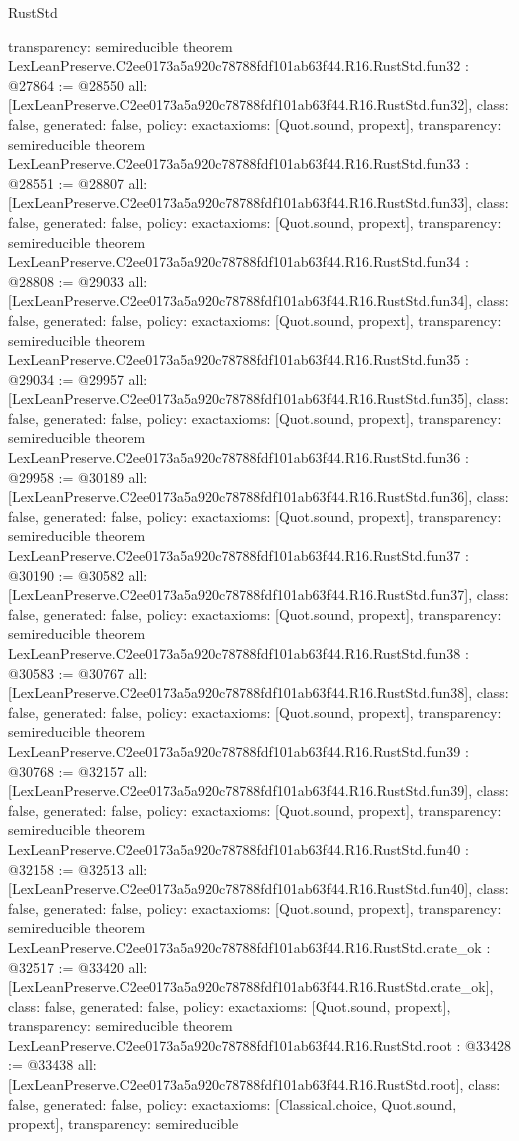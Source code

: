 \begin{lexlean}{RustStd}
\begin{coremodule}
{  transparency: semireducible
}
theorem LexLeanPreserve.C2ee0173a5a920c78788fdf101ab63f44.R16.RustStd.fun32 : @27864 := @28550 {
  all: [LexLeanPreserve.C2ee0173a5a920c78788fdf101ab63f44.R16.RustStd.fun32],
  class: false,
  generated: false,
  policy: exact{axioms: [Quot.sound, propext]},
  transparency: semireducible
}
theorem LexLeanPreserve.C2ee0173a5a920c78788fdf101ab63f44.R16.RustStd.fun33 : @28551 := @28807 {
  all: [LexLeanPreserve.C2ee0173a5a920c78788fdf101ab63f44.R16.RustStd.fun33],
  class: false,
  generated: false,
  policy: exact{axioms: [Quot.sound, propext]},
  transparency: semireducible
}
theorem LexLeanPreserve.C2ee0173a5a920c78788fdf101ab63f44.R16.RustStd.fun34 : @28808 := @29033 {
  all: [LexLeanPreserve.C2ee0173a5a920c78788fdf101ab63f44.R16.RustStd.fun34],
  class: false,
  generated: false,
  policy: exact{axioms: [Quot.sound, propext]},
  transparency: semireducible
}
theorem LexLeanPreserve.C2ee0173a5a920c78788fdf101ab63f44.R16.RustStd.fun35 : @29034 := @29957 {
  all: [LexLeanPreserve.C2ee0173a5a920c78788fdf101ab63f44.R16.RustStd.fun35],
  class: false,
  generated: false,
  policy: exact{axioms: [Quot.sound, propext]},
  transparency: semireducible
}
theorem LexLeanPreserve.C2ee0173a5a920c78788fdf101ab63f44.R16.RustStd.fun36 : @29958 := @30189 {
  all: [LexLeanPreserve.C2ee0173a5a920c78788fdf101ab63f44.R16.RustStd.fun36],
  class: false,
  generated: false,
  policy: exact{axioms: [Quot.sound, propext]},
  transparency: semireducible
}
theorem LexLeanPreserve.C2ee0173a5a920c78788fdf101ab63f44.R16.RustStd.fun37 : @30190 := @30582 {
  all: [LexLeanPreserve.C2ee0173a5a920c78788fdf101ab63f44.R16.RustStd.fun37],
  class: false,
  generated: false,
  policy: exact{axioms: [Quot.sound, propext]},
  transparency: semireducible
}
theorem LexLeanPreserve.C2ee0173a5a920c78788fdf101ab63f44.R16.RustStd.fun38 : @30583 := @30767 {
  all: [LexLeanPreserve.C2ee0173a5a920c78788fdf101ab63f44.R16.RustStd.fun38],
  class: false,
  generated: false,
  policy: exact{axioms: [Quot.sound, propext]},
  transparency: semireducible
}
theorem LexLeanPreserve.C2ee0173a5a920c78788fdf101ab63f44.R16.RustStd.fun39 : @30768 := @32157 {
  all: [LexLeanPreserve.C2ee0173a5a920c78788fdf101ab63f44.R16.RustStd.fun39],
  class: false,
  generated: false,
  policy: exact{axioms: [Quot.sound, propext]},
  transparency: semireducible
}
theorem LexLeanPreserve.C2ee0173a5a920c78788fdf101ab63f44.R16.RustStd.fun40 : @32158 := @32513 {
  all: [LexLeanPreserve.C2ee0173a5a920c78788fdf101ab63f44.R16.RustStd.fun40],
  class: false,
  generated: false,
  policy: exact{axioms: [Quot.sound, propext]},
  transparency: semireducible
}
theorem LexLeanPreserve.C2ee0173a5a920c78788fdf101ab63f44.R16.RustStd.crate_ok : @32517 := @33420 {
  all: [LexLeanPreserve.C2ee0173a5a920c78788fdf101ab63f44.R16.RustStd.crate_ok],
  class: false,
  generated: false,
  policy: exact{axioms: [Quot.sound, propext]},
  transparency: semireducible
}
theorem LexLeanPreserve.C2ee0173a5a920c78788fdf101ab63f44.R16.RustStd.root : @33428 := @33438 {
  all: [LexLeanPreserve.C2ee0173a5a920c78788fdf101ab63f44.R16.RustStd.root],
  class: false,
  generated: false,
  policy: exact{axioms: [Classical.choice, Quot.sound, propext]},
  transparency: semireducible
}


\end{coremodule}
\end{lexlean}
